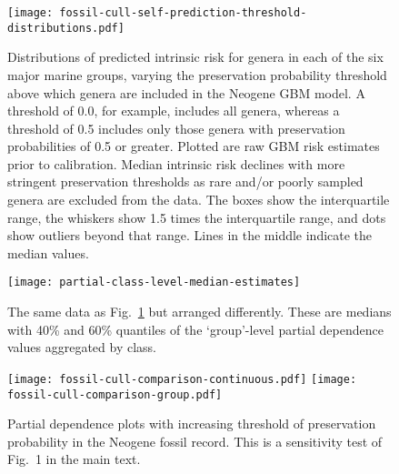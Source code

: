 \documentclass[11pt]{article}
\begin{document}
\begin{figure}[htbp]
\begin{center}
\texttt{[image: fossil-cull-self-prediction-threshold-distributions.pdf]}
\caption{Distributions of predicted intrinsic risk for genera in each of the six major marine groups, varying the preservation probability threshold above which genera are included in the Neogene GBM model. A threshold of 0.0, for example, includes all genera, whereas a threshold of 0.5 includes only those genera with preservation probabilities of 0.5 or greater. Plotted are raw GBM risk estimates prior to calibration. Median intrinsic risk declines with more stringent preservation thresholds as rare and/or poorly sampled genera are excluded from the data. The boxes show the interquartile range, the whiskers show 1.5 times the interquartile range, and dots show outliers beyond that range. Lines in the middle indicate the median values.}
\label{fig:ext-boxplots-paleo-culls}
\end{center}
\end{figure}

\clearpage

\begin{figure}[htbp]
\begin{center}
\texttt{[image: partial-class-level-median-estimates]}
\caption{The same data as Fig.~\ref{fig:ext-boxplots-paleo-culls} but arranged differently. These are medians with 40\% and 60\% quantiles of the `group'-level partial dependence values aggregated by class.}
\label{fig:class-level-partial-order}
\end{center}
\end{figure}

\clearpage

\begin{figure}[htbp]
\begin{center}
\texttt{[image: fossil-cull-comparison-continuous.pdf]}
\texttt{[image: fossil-cull-comparison-group.pdf]}
\caption{Partial dependence plots with increasing threshold of preservation probability in the Neogene fossil record. This is a sensitivity test of Fig.~1 in the main text.}
\label{fig:partial-paleo-culls}
\end{center}
\end{figure}

\clearpage

%
\clearpage
\end{document}
